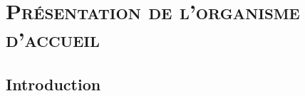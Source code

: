 

\chapter{\scshape{Présentation de l'organisme d'accueil}}
\thispagestyle{empty}


\newpage
\section*{Introduction}
